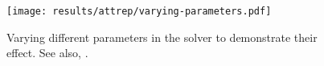 \begin{figure}[H]
  \centering
  \texttt{[image: results/attrep/varying-parameters.pdf]}
  \caption[Varying parameters in the solver]{
    Varying different parameters in the solver to demonstrate their effect.
    See also, .
  }
  \label{fig:varying-parameters}
\end{figure}
